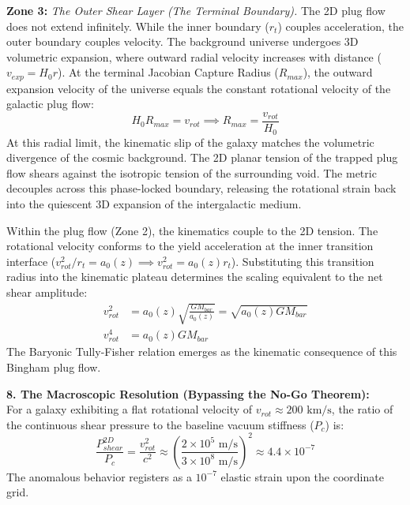 \textbf{Zone 3:}  \textit{The Outer Shear Layer (The Terminal Boundary).}
The 2D plug flow does not extend infinitely.  While the inner boundary ($r_t$) couples acceleration, the outer boundary couples velocity. The background universe undergoes 3D volumetric expansion, where outward radial velocity increases with distance ($v_{exp} = H_0 r$). At the terminal Jacobian Capture Radius ($R_{max}$), the outward expansion velocity of the universe equals the constant rotational velocity of the galactic plug flow:
\begin{equation}
    H_0 R_{max} = v_{rot} \implies R_{max} = \frac{v_{rot}}{H_0}
\end{equation}
At this radial limit, the kinematic slip of the galaxy matches the volumetric divergence of the cosmic background.  The 2D planar tension of the trapped plug flow shears against the isotropic tension of the surrounding void. The metric decouples across this phase-locked boundary, releasing the rotational strain back into the quiescent 3D expansion of the intergalactic medium. 

Within the plug flow (Zone 2), the kinematics couple to the 2D tension. The rotational velocity conforms to the yield acceleration at the inner transition interface ($v_{rot}^2 / r_t = a_0(z) \implies v_{rot}^2 = a_0(z) r_t$). 
Substituting this transition radius into the kinematic plateau determines the scaling equivalent to the net shear amplitude: 
\begin{align}
    v_{rot}^2 &= a_0(z) \sqrt{\frac{G M_{bar}}{a_0(z)}} = \sqrt{a_0(z) G M_{bar}} \nonumber \\
    v_{rot}^4 &= a_0(z) G M_{bar} \label{eq:tully_fisher_derivation}
\end{align}
The Baryonic Tully-Fisher relation emerges as the kinematic consequence of this Bingham plug flow. 

\textbf{8. The Macroscopic Resolution (Bypassing the No-Go Theorem):} \\
For a galaxy exhibiting a flat rotational velocity of $v_{rot} \approx 200 \text{ km/s}$, the ratio of the continuous shear pressure to the baseline vacuum stiffness ($P_c$) is: 
\begin{equation}
    \frac{P_{shear}^{2D}}{P_c} = \frac{v_{rot}^2}{c^2} \approx \left( \frac{2 \times 10^5 \text{ m/s}}{3 \times 10^8 \text{ m/s}} \right)^2 \approx 4.4 \times 10^{-7}
\end{equation}
The anomalous behavior registers as a $10^{-7}$ elastic strain upon the coordinate grid. 

